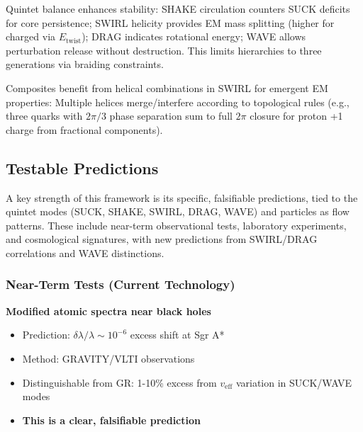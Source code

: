 Quintet balance enhances stability: SHAKE circulation counters SUCK deficits for core persistence; SWIRL helicity provides EM mass splitting (higher for charged via $E_{\text{twist}}$); DRAG indicates rotational energy; WAVE allows perturbation release without destruction. This limits hierarchies to three generations via braiding constraints.

Composites benefit from helical combinations in SWIRL for emergent EM properties: Multiple helices merge/interfere according to topological rules (e.g., three quarks with $2\pi/3$ phase separation sum to full $2\pi$ closure for proton +1 charge from fractional components).

\medskip

\subsection{Testable Predictions}

A key strength of this framework is its specific, falsifiable predictions, tied to the quintet modes (SUCK, SHAKE, SWIRL, DRAG, WAVE) and particles as flow patterns. These include near-term observational tests, laboratory experiments, and cosmological signatures, with new predictions from SWIRL/DRAG correlations and WAVE distinctions.

\subsubsection{Near-Term Tests (Current Technology)}
\textbf{Modified atomic spectra near black holes}
\begin{itemize}
\item Prediction: $\delta\lambda/\lambda \sim 10^{-6}$ excess shift at Sgr A*
\item Method: GRAVITY/VLTI observations
\item Distinguishable from GR: 1-10\% excess from $v_{\text{eff}}$ variation in SUCK/WAVE modes
\item \textbf{This is a clear, falsifiable prediction}
\end{itemize}

